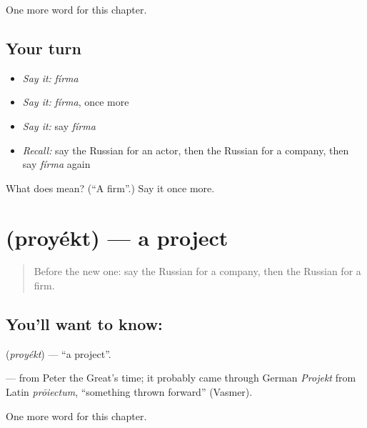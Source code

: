 \begin{grammarlens}[title={What you've built}]
One more word for this chapter.
\end{grammarlens}

\subsection*{Your turn}
\begin{itemize}
\raggedright
  \item \emph{Say it:} \emph{fírma}
  \item \emph{Say it:} \emph{fírma}, once more
  \item \emph{Say it:} say \emph{fírma}
  \item \emph{Recall:} say the Russian for an actor, then the Russian for a company, then say \emph{fírma} again
\end{itemize}

\begin{tcolorbox}[breakable,colback=teal!4,colframe=teal!35!black,title={Before you move on}]
What does  mean? (\textquotedblleft{}A firm\textquotedblright{}.) Say it once more.
\end{tcolorbox}
\section[\texorpdfstring{\ru{проект} (proyékt)}{проект (proyékt)}]{ (proyékt) — a project}

\label{lesson:RU-C257-proyekt}



\begin{quote}
Before the new one: say the Russian for a company, then the Russian for a firm.
\end{quote}

\subsection*{You'll want to know: }
\textbf{} (\emph{proyékt}) — \textquotedblleft{}a project\textquotedblright{}.

\begin{cousinweb}
\textbf{} — from Peter the Great's time; it probably came through German \emph{Projekt} from Latin \emph{prōiectum}, \textquotedblleft{}something thrown forward\textquotedblright{} (Vasmer).
\end{cousinweb}

\begin{grammarlens}[title={What you've built}]
One more word for this chapter.
\end{grammarlens}

